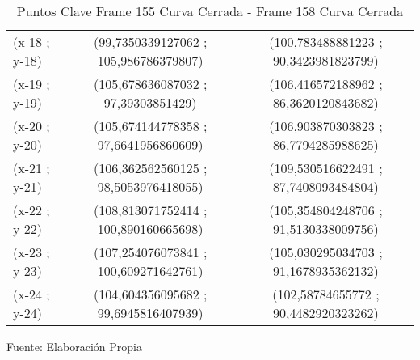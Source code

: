 \begin{table}[htbp]
\begin{tabular}{|l|c|c|}
		(x-18 ; y-18) & (99,7350339127062 ; 105,986786379807) & (100,783488881223 ; 90,3423981823799) \\
		(x-19 ; y-19) & (105,678636087032 ; 97,39303851429) & (106,416572188962 ; 86,3620120843682) \\
		(x-20 ; y-20) & (105,674144778358 ; 97,6641956860609) & (106,903870303823 ; 86,7794285988625) \\
		(x-21 ; y-21) & (106,362562560125 ; 98,5053976418055) & (109,530516622491 ; 87,7408093484804) \\
		(x-22 ; y-22) & (108,813071752414 ; 100,890160665698) & (105,354804248706 ; 91,5130338009756) \\
		(x-23 ; y-23) & (107,254076073841 ; 100,609271642761) & (105,030295034703 ; 91,1678935362132) \\
		(x-24 ; y-24) & (104,604356095682 ; 99,6945816407939) & (102,58784655772 ; 90,4482920323262) \\ \hline
	\end{tabular}%
	\caption{Puntos Clave Frame 155 Curva Cerrada - Frame 158 Curva Cerrada }
	\footnotesize Fuente: Elaboración Propia
	\label{checkerporcentage4}
\end{table}%
\restoregeometry


